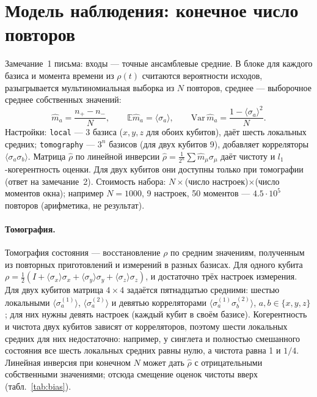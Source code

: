 \documentclass[12pt,a4paper]{article}
\begin{document}
\section{Модель наблюдения: конечное число повторов}

Замечание~1 письма: входы --- точные ансамблевые средние. В блоке  для
каждого базиса и момента времени из $\rho(t)$ считаются вероятности исходов, разыгрывается
мультиномиальная выборка из $N$ повторов, среднее --- выборочное среднее собственных значений:
\begin{equation}
\hat m_a=\frac{n_+-n_-}{N},\qquad \mathbb E\hat m_a=\langle\sigma_a\rangle,\qquad
\mathrm{Var}\,\hat m_a=\frac{1-\langle\sigma_a\rangle^2}{N}.
\end{equation}
Настройки: \texttt{local} --- 3 базиса ($x,y,z$ для обоих кубитов), даёт шесть локальных средних;
\texttt{tomography} --- $3^n$ базисов (для двух кубитов 9), добавляет корреляторы
$\langle\sigma_a\sigma_b\rangle$. Матрица $\hat\rho$ по линейной инверсии
$\hat\rho=\tfrac1{2^n}\sum \hat m_{\mu}\sigma_\mu$ даёт чистоту и $l_1$-когерентность оценки. Для двух кубитов
они доступны только при томографии (ответ на замечание~2). Стоимость набора: $N\times$(число
настроек)$\times$(число моментов окна); например $N=1000$, 9 настроек, 50 моментов --- $4.5\cdot10^5$
повторов (арифметика, не результат).

\paragraph{Томография.} Томография состояния --- восстановление $\rho$ по средним значениям, полученным
из повторных приготовлений и измерений в разных базисах. Для одного кубита
$\rho=\tfrac12(I+\langle\sigma_x\rangle\sigma_x+\langle\sigma_y\rangle\sigma_y+\langle\sigma_z\rangle\sigma_z)$, и достаточно
трёх настроек измерения. Для двух кубитов матрица $4\times4$ задаётся пятнадцатью средними: шестью
локальными $\langle\sigma_a^{(1)}\rangle$, $\langle\sigma_a^{(2)}\rangle$ и девятью корреляторами
$\langle\sigma_a^{(1)}\sigma_b^{(2)}\rangle$, $a,b\in\{x,y,z\}$; для них нужны девять настроек (каждый кубит в
своём базисе). Когерентность и чистота двух кубитов зависят от корреляторов, поэтому шести локальных
средних для них недостаточно: например, у синглета и полностью смешанного состояния все шесть
локальных средних равны нулю, а чистота равна 1 и $1/4$. Линейная инверсия при конечном $N$ может
дать $\hat\rho$ с отрицательными собственными значениями; отсюда смещение оценок чистоты вверх
(табл.~\ref{tab:bias}).
\end{document}
